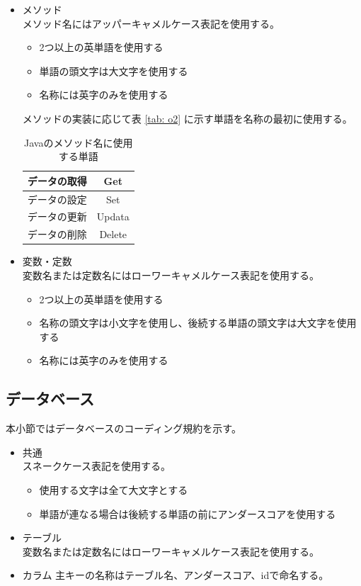 \documentclass[a4j]{jarticle}
\begin{document}
\begin{itemize}
	\item メソッド\\
		メソッド名にはアッパーキャメルケース表記を使用する。
	\begin{itemize}
		\item 2つ以上の英単語を使用する
		\item 単語の頭文字は大文字を使用する
		\item 名称には英字のみを使用する
	\end{itemize}
		メソッドの実装に応じて表 \ref {tab: o2} に示す単語を名称の最初に使用する。
				\begin{table}[H]
			\caption{Javaのメソッド名に使用する単語}
			\label{tab:o2}
			\begin{center}
			\begin{tabular}{|c|c|}
			\hline
			データの取得 & Get\\\hline
			データの設定 & Set\\\hline
			データの更新  & Updata\\\hline
			データの削除  & Delete\\\hline
			\end{tabular}
			\end{center}
			\end{table}
	\item 変数・定数\\
		変数名または定数名にはローワーキャメルケース表記を使用する。
	\begin{itemize}
		\item 2つ以上の英単語を使用する
		\item 名称の頭文字は小文字を使用し、後続する単語の頭文字は大文字を使用する
		\item 名称には英字のみを使用する
	\end{itemize}
\end{itemize}
\subsection{データベース}
本小節ではデータベースのコーディング規約を示す。
	\begin{itemize}
	\item 共通\\
		スネークケース表記を使用する。
	\begin{itemize}
		\item 使用する文字は全て大文字とする
		\item 単語が連なる場合は後続する単語の前にアンダースコアを使用する
	\end{itemize}
	\item テーブル\\
		変数名または定数名にはローワーキャメルケース表記を使用する。
	\item カラム
		主キーの名称はテーブル名、アンダースコア、idで命名する。
\end{itemize}
\end{document}
